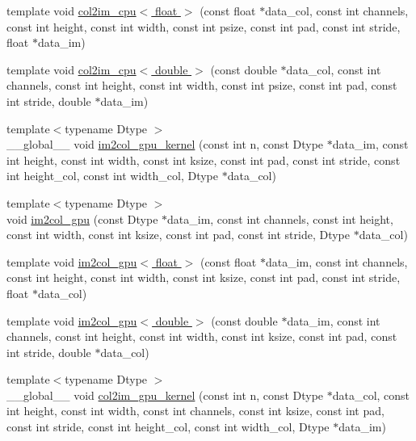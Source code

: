 \begin{DoxyCompactItemize}
\item 
template void \hyperlink{namespacecaffe_a8942c3fb0c87fb6d951d6d37a51b63e9}{col2im\+\_\+cpu$<$ float $>$} (const float $\ast$data\+\_\+col, const int channels, const int height, const int width, const int psize, const int pad, const int stride, float $\ast$data\+\_\+im)
\item 
template void \hyperlink{namespacecaffe_a41a9fdd9b353e79de4c3a45d9aa32252}{col2im\+\_\+cpu$<$ double $>$} (const double $\ast$data\+\_\+col, const int channels, const int height, const int width, const int psize, const int pad, const int stride, double $\ast$data\+\_\+im)
\item 
{\footnotesize template$<$typename Dtype $>$ }\\\+\_\+\+\_\+global\+\_\+\+\_\+ void \hyperlink{namespacecaffe_a11ed6a7eca37a3810d9dd173cfc1c871}{im2col\+\_\+gpu\+\_\+kernel} (const int n, const Dtype $\ast$data\+\_\+im, const int height, const int width, const int ksize, const int pad, const int stride, const int height\+\_\+col, const int width\+\_\+col, Dtype $\ast$data\+\_\+col)
\item 
{\footnotesize template$<$typename Dtype $>$ }\\void \hyperlink{namespacecaffe_ac27906020365bbdd789307ab27064d28}{im2col\+\_\+gpu} (const Dtype $\ast$data\+\_\+im, const int channels, const int height, const int width, const int ksize, const int pad, const int stride, Dtype $\ast$data\+\_\+col)
\item 
template void \hyperlink{namespacecaffe_a500c953ed9e8940174c8a59b7165b824}{im2col\+\_\+gpu$<$ float $>$} (const float $\ast$data\+\_\+im, const int channels, const int height, const int width, const int ksize, const int pad, const int stride, float $\ast$data\+\_\+col)
\item 
template void \hyperlink{namespacecaffe_aa0f4b89a20fbbfe2f055ea8737b054b4}{im2col\+\_\+gpu$<$ double $>$} (const double $\ast$data\+\_\+im, const int channels, const int height, const int width, const int ksize, const int pad, const int stride, double $\ast$data\+\_\+col)
\item 
{\footnotesize template$<$typename Dtype $>$ }\\\+\_\+\+\_\+global\+\_\+\+\_\+ void \hyperlink{namespacecaffe_a3a26760e107a595c92a0523f7c02928a}{col2im\+\_\+gpu\+\_\+kernel} (const int n, const Dtype $\ast$data\+\_\+col, const int height, const int width, const int channels, const int ksize, const int pad, const int stride, const int height\+\_\+col, const int width\+\_\+col, Dtype $\ast$data\+\_\+im)

\end{DoxyCompactItemize}
